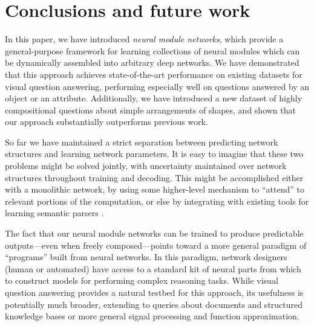 \section{Conclusions and future work}

In this paper, we have introduced \emph{neural module networks}, which provide a
general-purpose framework for learning collections of neural modules which can
be dynamically assembled into arbitrary deep networks. We have demonstrated that
this approach achieves state-of-the-art performance on existing datasets for
visual question answering, performing especially well on questions answered by
an object or an attribute. Additionally, we have introduced a new dataset of
highly compositional questions about simple arrangements of shapes, and shown
that our approach substantially outperforms previous work.

So far we have maintained a strict separation between predicting network
structures and learning network parameters. It is easy to imagine that these two
problems might be solved jointly, with uncertainty maintained over network
structures throughout training and decoding. This might be accomplished either
with a monolithic network, by using some higher-level mechanism to ``attend'' to
relevant portions of the computation, or else by integrating with existing tools
for learning semantic parsers \cite{Krish2013Grounded}.

The fact that our neural module networks can be trained to produce predictable
outputs---even when freely composed---points toward a more general paradigm of
``programs'' built from neural networks. In this paradigm, network designers
(human or automated) have access to a standard kit of neural parts from which to
construct models for performing complex reasoning tasks. While visual question
answering provides a natural testbed for this approach, its usefulness is
potentially much broader, extending to queries about documents and structured
knowledge bases or more general signal processing and function approximation.

\small




